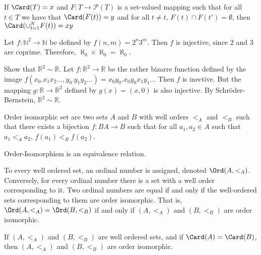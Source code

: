 \documentclass[crop=false,class=article,oneside]{standalone}
\begin{document}
        \begin{theorem*}
            If $\Card(T)=x$ and
            $F:{T}\rightarrow{\mathcal{P}(T)}$
            is a set-valued mapping such that for all
            ${t}\in{T}$ we have that
            $\Card(F(t))=y$ and
            for all ${t}\ne{t}$,
            ${F(t)}\cap{F(t')}=\emptyset$, then
            $\Card(\cup_{t=1}^{N}F(t))=xy$
        \end{theorem*}
        \begin{example}
            Let $f:{\mathbb{N}^{2}}\rightarrow{\mathbb{N}}$
            be defined by $f(n,m)=2^{n}3^{m}$.
            Then $f$ is injective, since $2$ and $3$
            are coprime. Therefore,
            $\aleph_{0}\times\aleph_{0}=\aleph_{0}$.
        \end{example}
        \begin{example}
            Show that $\mathbb{R}^{2}\sim\mathbb{R}$.
            Let $f:\mathbb{R}^{2}\rightarrow\mathbb{R}$
            be the rather bizarre function defined by the image
            $f(x_{0}.x_{1}x_{2}\hdots,y_{0}.y_{1}y_{2}\hdots)%
             =x_{0}y_{0}.x_{0}y_{0}x_{1}y_{1}\hdots$ Then
            $f$ is inective. But the mapping
            $g:\mathbb{R}\rightarrow\mathbb{R}^{2}$
            defined by $g(x)=(x,0)$ is also injective.
            By Schr\"{o}der-Bernstein,
            $\mathbb{R}^{2}\sim\mathbb{R}$.
        \end{example}
        \begin{definition}
           Order isomorphic set are two sets $A$ and $B$
           with well orders $<_{A}$ and $<_{B}$ such that
           there exists a bijection $f:{B}A\rightarrow{B}$
           such that for all $a_{1},a_{2}\in{A}$ such that
           $a_{1}<_{A}a_{2}$, $f(a_{1})<_{B}f(a_{2})$.
        \end{definition}
        \begin{theorem*}
           Order-Isomorphism is an equivalence relation.
        \end{theorem*}
        To every well ordered set, an ordinal number is
        assigned, denoted $\Ord(A,<_{A})$. Conversely,
        for every ordinal number there is a set with a
        well order corresponding to it. Two ordinal numbers
        are equal if and only if the well-ordered sets
        corresponding to them are order isomorphic.
        That is,
        $\Ord(A,<_{A})=\Ord(B,<_{B})$ if and only if
        $(A,<_{A})$ and $(B,<_{B})$ are order isomorphic.
        \begin{theorem*}
           If $(A,<_{A})$ and $(B,<_{B})$ are well ordered
           sets, and if $\Card(A)=\Card(B)$, then
           $(A,<_{A})$ and $(B,<_{B})$ are order
           isomorphic.
        \end{theorem*}
\end{document}
